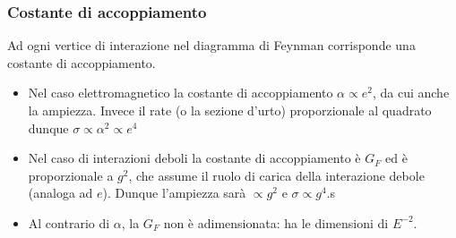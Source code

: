 \subsubsection{Costante di accoppiamento}
Ad ogni vertice di interazione nel diagramma di Feynman corrisponde una costante di accoppiamento.
\begin{itemize}
    \item Nel caso elettromagnetico la costante di accoppiamento $\alpha\propto e^2$, da cui anche la ampiezza. Invece il rate (o la sezione d'urto) proporzionale al quadrato dunque $\sigma\propto\alpha^2\propto e^4$ 
    \item Nel caso di interazioni deboli la costante di accoppiamento è $G_F$ ed è proporzionale a $g^2$, che assume il ruolo di carica della interazione debole (analoga ad $e$). Dunque l'ampiezza sarà $\propto g^2$ e $\sigma\propto g^4$.s
    \item Al contrario di $\alpha$, la $G_F$ non è adimensionata: ha le dimensioni di $E^{-2}$.
\end{itemize}

